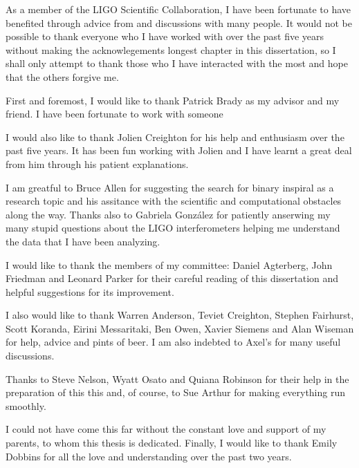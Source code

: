 
As a member of the LIGO Scientific Collaboration, I have been fortunate to
have benefited through advice from and discussions with many people. It would
not be possible to thank everyone who I have worked with over the past five
years without making the acknowlegements longest chapter in this dissertation,
so I shall only attempt to thank those who I have interacted with the most and
hope that the others forgive me.

First and foremost, I would like to thank Patrick Brady as my advisor and my
friend. I have been fortunate to work with someone 

I would also like to thank Jolien Creighton for his help and enthusiasm over
the past five years. It has been fun working with Jolien and I have learnt a
great deal from him through his patient explanations.

I am greatful to Bruce Allen for suggesting the search for binary inspiral as
a research topic and his assitance with the scientific and computational
obstacles along the way. Thanks also to Gabriela Gonz\'{a}lez for patiently
anserwing my many stupid questions about the LIGO interferometers helping me
understand the data that I have been analyzing.

I would like to thank the members of my committee: Daniel Agterberg, John
Friedman and Leonard Parker for their careful reading of this dissertation and
helpful suggestions for its improvement.

I also would like to thank Warren Anderson, Teviet Creighton, Stephen
Fairhurst, Scott Koranda, Eirini Messaritaki, Ben Owen, Xavier Siemens and
Alan Wiseman for help, advice and pints of beer. I am also indebted to Axel's
for many useful discussions.

Thanks to Steve Nelson, Wyatt Osato and Quiana Robinson for their help in the
preparation of this this and, of course, to Sue Arthur for making everything
run smoothly.

I could not have come this far without the constant love and support of my
parents, to whom this thesis is dedicated. Finally, I would like to thank
Emily Dobbins for all the love and understanding over the past two years.
